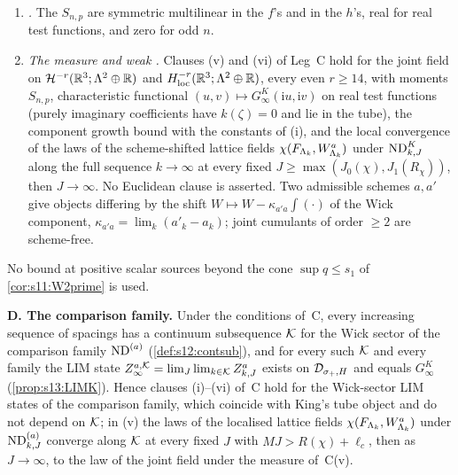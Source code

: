 \begin{theorem}
\begin{enumerate}[label=\textup{(\roman*)},leftmargin=*]
\item \emph{\OSth.} The $S_{n,p}$ are symmetric multilinear in the $f$'s and in the $h$'s, real for real test functions, and zero for odd $n$.
\item[\textup{(v),(vi)}] \emph{The measure and weak \OSf.} Clauses (v) and (vi) of Leg~C hold for the joint field on $\mathcal H^{-r}(\mathbb R^3;\Lambda^2\oplus\mathbb R)$ and $H^{-r}_{\rm loc}(\mathbb R^3;\Lambda^2\oplus\mathbb R)$, every even $r\ge14$, with moments $S_{n,p}$, characteristic functional $(u,v)\mapsto G^K_\infty(\mathrm iu,\mathrm iv)$ on real test functions (purely imaginary coefficients have $k(\zeta)=0$ and lie in the tube), the component growth bound with the constants of (i), and the local convergence of the laws of the scheme-shifted lattice fields $\chi(F_{\Lambda_k},W^a_{\Lambda_k})$ under $\mathrm{ND}^{K}_{k,J}$ along the full sequence $k\to\infty$ at every fixed $J\ge\max(J_0(\chi),J_1(R_\chi))$, then $J\to\infty$. No Euclidean clause is asserted. Two admissible schemes $a,a'$ give objects differing by the shift $W\mapsto W-\kappa_{a'a}\int(\cdot)$ of the Wick component, $\kappa_{a'a}=\lim_k(a'_k-a_k)$; joint cumulants of order $\ge2$ are scheme-free.
\end{enumerate}
No bound at positive scalar sources beyond the cone $\sup q\le s_1$ of \cref{cor:s11:W2prime} is used.

\smallskip\noindent\textbf{D. The comparison family.} Under the conditions of~C, every increasing sequence of spacings has a continuum subsequence $\mathcal K$ for the Wick sector of the comparison family $\mathrm{ND}^{(a)}$ (\cref{def:s12:contsub}), and for every such $\mathcal K$ and every family the LIM state $Z^{a,\mathcal K}_\infty=\lim_J\lim_{k\in\mathcal K}Z^a_{k,J}$ exists on $\mathcal D_{\sigma_+,H}$ and equals $G^K_\infty$ (\cref{prop:s13:LIMK}). Hence clauses (i)--(vi) of~C hold for the Wick-sector LIM states of the comparison family, which coincide with King's tube object and do not depend on $\mathcal K$; in (v) the laws of the localised lattice fields $\chi(F_{\Lambda_k},W^a_{\Lambda_k})$ under $\mathrm{ND}^{(a)}_{k,J}$ converge along $\mathcal K$ at every fixed $J$ with $MJ>R(\chi)+\ell_c$, then as $J\to\infty$, to the law of the joint field under the measure of~C(v).
\end{theorem}

